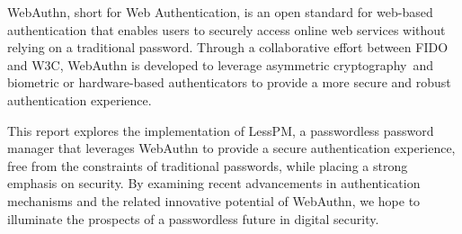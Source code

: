 WebAuthn, short for Web Authentication, is an open standard for web-based
authentication that enables users to securely access online web services without
relying on a traditional password.
Through a collaborative effort between FIDO and W3C, WebAuthn is developed to
leverage asymmetric cryptography\assymetricCrypto\jsonwebLibrary~and biometric
or hardware-based authenticators to provide a more secure and robust
authentication experience.

This report explores the implementation of LessPM, a passwordless password
manager that leverages WebAuthn to provide a secure authentication experience,
free from the constraints of traditional passwords, while placing a strong
emphasis on security.
By examining recent advancements in authentication mechanisms and the related
innovative potential of WebAuthn, we hope to illuminate the prospects of a
passwordless future in digital security.


